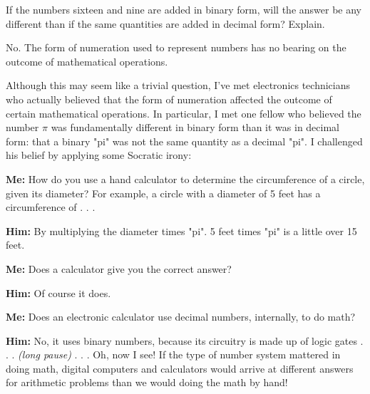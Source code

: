

If the numbers sixteen and nine are added in binary form, will the answer be any different than if the same quantities are added in decimal form?  Explain.







No.  The form of numeration used to represent numbers has no bearing on the outcome of mathematical operations.







Although this may seem like a trivial question, I've met electronics technicians who actually believed that the form of numeration affected the outcome of certain mathematical operations.  In particular, I met one fellow who believed the number $\pi$ was fundamentally different in binary form than it was in decimal form: that a binary "pi" was not the same quantity as a decimal "pi".  I challenged his belief by applying some Socratic irony:

\vskip 10pt

{\narrower 

\noindent
{\bf Me:} How do you use a hand calculator to determine the circumference of a circle, given its diameter?  For example, a circle with a diameter of 5 feet has a circumference of . . .

\vskip 10pt

\noindent
{\bf Him:} By multiplying the diameter times "pi".  5 feet times "pi" is a little over 15 feet.

\vskip 10pt

\noindent
{\bf Me:} Does a calculator give you the correct answer?

\vskip 10pt

\noindent
{\bf Him:} Of course it does.

\vskip 10pt

\noindent
{\bf Me:} Does an electronic calculator use decimal numbers, internally, to do math?

\vskip 10pt

\noindent
{\bf Him:} No, it uses binary numbers, because its circuitry is made up of logic gates . . . {\it (long pause)} . . . Oh, now I see!  If the type of number system mattered in doing math, digital computers and calculators would arrive at different answers for arithmetic problems than we would doing the math by hand!

\par} 

